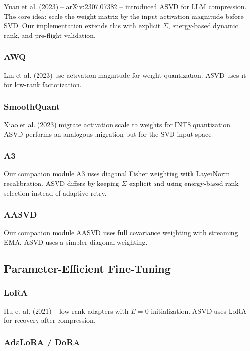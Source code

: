 Yuan et al. (2023) -- arXiv:2307.07382 -- introduced ASVD for LLM 
compression. The core idea: scale the weight matrix by the input activation 
magnitude before SVD. Our implementation extends this with explicit $\Sigma$, 
energy-based dynamic rank, and pre-flight validation.

\subsubsection{AWQ}

Lin et al. (2023) use activation magnitude for weight quantization. 
ASVD uses it for low-rank factorization.

\subsubsection{SmoothQuant}

Xiao et al. (2023) migrate activation scale to weights for INT8 quantization. 
ASVD performs an analogous migration but for the SVD input space.

\subsubsection{A3}

Our companion module A3 uses diagonal Fisher weighting with LayerNorm 
recalibration. ASVD differs by keeping $\Sigma$ explicit and using energy-based 
rank selection instead of adaptive retry.

\subsubsection{AASVD}

Our companion module AASVD uses full covariance weighting with streaming 
EMA. ASVD uses a simpler diagonal weighting.

\subsection{Parameter-Efficient Fine-Tuning}

\subsubsection{LoRA}

Hu et al. (2021) -- low-rank adapters with $B=0$ initialization. ASVD uses 
LoRA for recovery after compression.

\subsubsection{AdaLoRA / DoRA}

